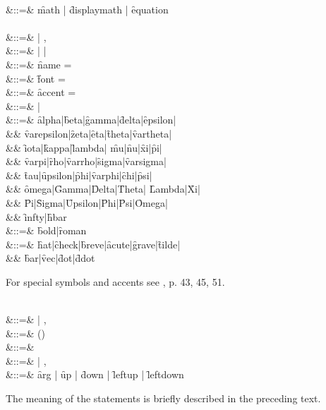 \begin{syntaxtable}
   \\
   &::=& \f{math} | \f{displaymath} | \f{equation} \\
   \\
   &::=&  | , \\
   &::=&  |  |  \\
   &::=& \f{name = }  \\
   &::=& \f{font = }  \\
   &::=& \f{accent = }  \\
   &::=&  |  \\
   &::=& \f{alpha}|\f{beta}|\f{gamma}|\f{delta}|\f{epsilon}| \\
     && \f{varepsilon}|\f{zeta}|\f{eta}|\f{theta}|\f{vartheta}| \\
     && \f{iota}|\f{kappa}|\f{lambda}| \f{mu}|\f{nu}|\f{xi}|\f{pi}| \\
     && \f{varpi}|\f{rho}|\f{varrho}|\f{sigma}|\f{varsigma}| \\
     && \f{tau}|\f{upsilon}|\f{phi}|\f{varphi}|\f{chi}|\f{psi}| \\
     && \f{omega}|\f{Gamma}|\f{Delta}|\f{Theta}| \f{Lambda}|\f{Xi}| \\
     && \f{Pi}|\f{Sigma}|\f{Upsilon}|\f{Phi}|\f{Psi}|\f{Omega}| \\
     && \f{infty}|\f{hbar} \\
   &::=& \f{bold}|\f{roman} \\
   &::=& \f{hat}|\f{check}|\f{breve}|\f{acute}|\f{grave}|\f{tilde}| \\
     && \f{bar}|\f{vec}|\f{dot}|\f{ddot}
\end{syntaxtable}

For special symbols and accents see \cite{Lamport:86}, p. 43, 45, 51.

\begin{syntaxtable}
   \\
   &::=&  | , \\
   &::=& () \\
   &::=&  \\
   &::=&  | , \\
   &::=& \f{arg} | \f{up} | \f{down} | \f{leftup} | \f{leftdown}
\end{syntaxtable}

The meaning of the statements is briefly described in the preceding
text.
